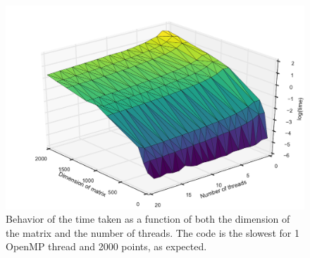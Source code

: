 \documentclass{article}
\begin{document}
\begin{figure}[p]
    \centering
    \includegraphics[width=\textwidth]{3d.pdf}
    \caption{Behavior of the time taken as a function of both the dimension of the matrix and the number of threads. The code is the slowest for 1 OpenMP thread and 2000 points, as expected.}
    \label{fig:3d}
\end{figure}
\end{document}
